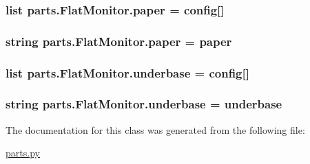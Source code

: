 \subsubsection[{paper}]{\setlength{\rightskip}{0pt plus 5cm}list parts.\+Flat\+Monitor.\+paper = config\mbox{[}\textquotesingle{}\mbox{]}\hspace{0.3cm}{\ttfamily [static]}}\label{classparts_1_1_flat_monitor_a7d9c9c12ad6f9aa631e1311fc0d3fa94}
\hypertarget{classparts_1_1_flat_monitor_a06549e5fe9a98b11e78c86b1c7c42ce5}{}
\subsubsection[{paper}]{\setlength{\rightskip}{0pt plus 5cm}string parts.\+Flat\+Monitor.\+paper = \textquotesingle{}paper\textquotesingle{}\hspace{0.3cm}{\ttfamily [static]}}\label{classparts_1_1_flat_monitor_a06549e5fe9a98b11e78c86b1c7c42ce5}
\hypertarget{classparts_1_1_flat_monitor_a5c9d47de6a4736f41a4e4364948295cb}{}
\subsubsection[{underbase}]{\setlength{\rightskip}{0pt plus 5cm}list parts.\+Flat\+Monitor.\+underbase = config\mbox{[}\textquotesingle{}\mbox{]}\hspace{0.3cm}{\ttfamily [static]}}\label{classparts_1_1_flat_monitor_a5c9d47de6a4736f41a4e4364948295cb}
\hypertarget{classparts_1_1_flat_monitor_aabfe77e5bd4348b9878651bb8c27338b}{}
\subsubsection[{underbase}]{\setlength{\rightskip}{0pt plus 5cm}string parts.\+Flat\+Monitor.\+underbase = \textquotesingle{}underbase\textquotesingle{}\hspace{0.3cm}{\ttfamily [static]}}\label{classparts_1_1_flat_monitor_aabfe77e5bd4348b9878651bb8c27338b}


The documentation for this class was generated from the following file\+:\begin{DoxyCompactItemize}
\item 
\hyperlink{parts_8py}{parts.\+py}\end{DoxyCompactItemize}
